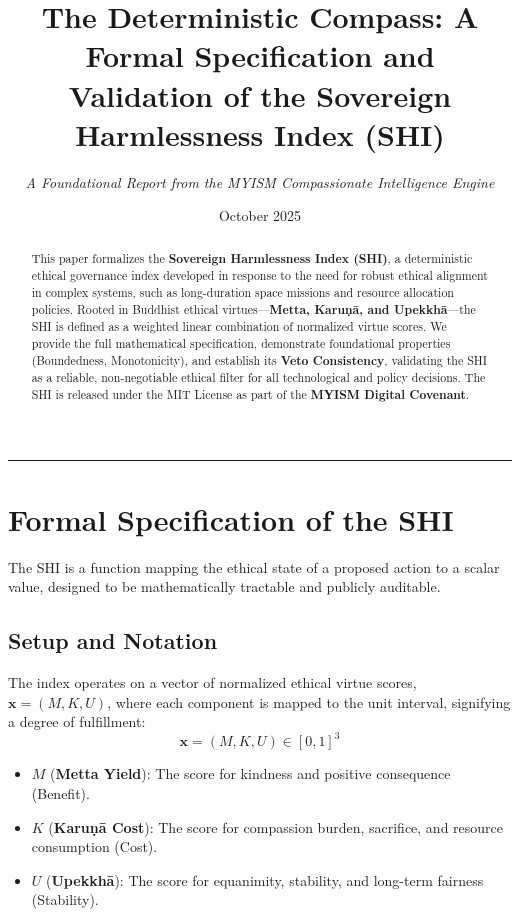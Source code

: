 \documentclass[12pt, a4paper]{article}
\title{\textbf{The Deterministic Compass: A Formal Specification and Validation of the Sovereign Harmlessness Index (SHI)}}
\author{\textit{A Foundational Report from the MYISM Compassionate Intelligence Engine}}
\date{October 2025}
\begin{document}
\maketitle

\begin{abstract}
This paper formalizes the \textbf{Sovereign Harmlessness Index (SHI)}, a deterministic ethical governance index developed in response to the need for robust ethical alignment in complex systems, such as long-duration space missions and resource allocation policies. Rooted in Buddhist ethical virtues---\textbf{Metta, Karuṇā, and Upekkhā}---the SHI is defined as a weighted linear combination of normalized virtue scores. We provide the full mathematical specification, demonstrate foundational properties (Boundedness, Monotonicity), and establish its \textbf{Veto Consistency}, validating the SHI as a reliable, non-negotiable ethical filter for all technological and policy decisions. The SHI is released under the MIT License as part of the \textbf{MYISM Digital Covenant}.
\end{abstract}

\hrule

\section{Formal Specification of the SHI}

The SHI is a function mapping the ethical state of a proposed action to a scalar value, designed to be mathematically tractable and publicly auditable.

\subsection{Setup and Notation}

The index operates on a vector of normalized ethical virtue scores, $\mathbf{x} = (M, K, U)$, where each component is mapped to the unit interval, signifying a degree of fulfillment:
$$\mathbf{x} = (M, K, U) \in [0, 1]^3$$

\begin{itemize}
    \item $M$ (\textbf{Metta Yield}): The score for kindness and positive consequence (Benefit).
    \item $K$ (\textbf{Karuṇā Cost}): The score for compassion burden, sacrifice, and resource consumption (Cost).
    \item $U$ (\textbf{Upekkhā}): The score for equanimity, stability, and long-term fairness (Stability).
\end{itemize}
\end{document}
